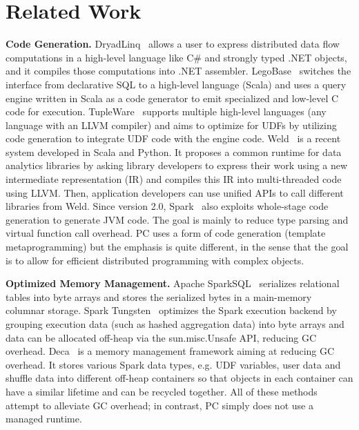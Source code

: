 
\section{Related Work}
\noindent
\textbf{Code Generation.} DryadLinq~\cite{yu2008dryadlinq} allows a user to express
distributed data flow
computations in a high-level language like C\# and strongly typed .NET
objects, and it compiles those computations into .NET assembler.
LegoBase~\cite{klonatos2014building} switches the interface
from declarative SQL to a high-level language (Scala) and uses a query engine
written in Scala as a code generator to emit specialized and low-level
C code for execution. TupleWare~\cite{crotty2015tupleware} supports
multiple high-level languages (any language with an LLVM compiler) 
and aims to
optimize for UDFs by utilizing code
generation to integrate UDF code with the engine 
code. 
Weld~\cite{palkar2017weld} is a recent system developed in Scala and
Python. It proposes
a common runtime for data analytics libraries by asking library
developers to express their work using a new intermediate
representation (IR) and compiles this IR into multi-threaded code using
LLVM.  Then, application developers can use unified APIs to
call different libraries from Weld. Since version 2.0, Spark~\cite{zaharia2012resilient}
also exploits whole-stage code generation to generate JVM 
code.  The goal is mainly to reduce type parsing and virtual function call
overhead. PC uses a form of code generation (template metaprogramming) but 
the emphasis is quite different, in the sense that the goal is to allow for
efficient distributed programming with complex objects.

\vspace{5pt}
\noindent
\textbf{Optimized Memory Management.} 
Apache SparkSQL~\cite{armbrust2015spark} serializes 
relational tables into byte arrays and stores the serialized bytes
in a main-memory columnar storage. Spark Tungsten~\cite{tungsten}
optimizes the Spark execution backend by grouping execution
data (such as hashed aggregation data) 
into byte arrays and data can be allocated off-heap via
the sun.misc.Unsafe API, reducing
GC overhead. Deca~\cite{lu2016lifetime} is a memory management framework aiming at
reducing GC overhead. It stores
various Spark data types, e.g. UDF variables, user data and
shuffle data into different
off-heap containers so that objects in each container can have a similar
lifetime and can be recycled together.
All of these methods attempt to alleviate GC overhead; in contrast, PC simply does
not use a managed runtime.

